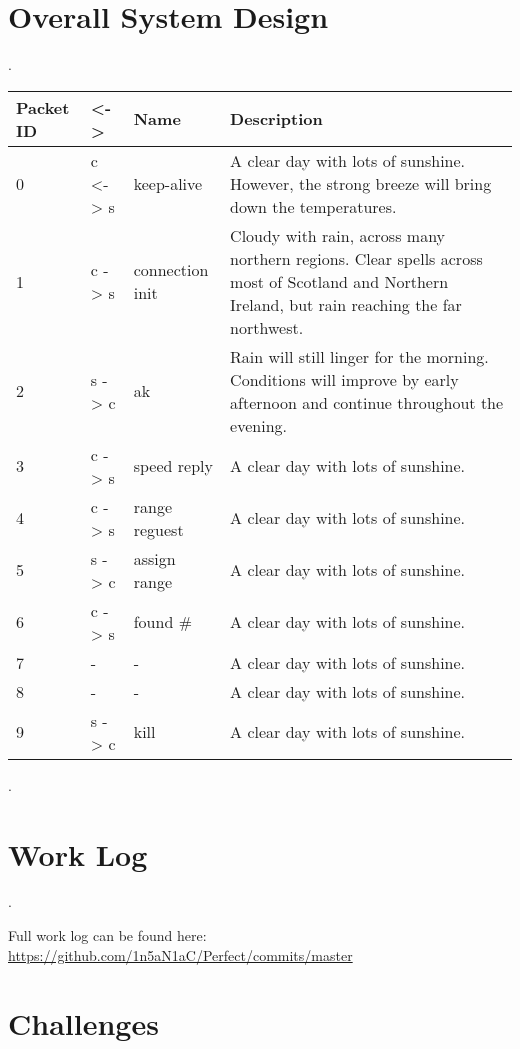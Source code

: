 \documentclass[letterpaper,10pt,titlepage]{article}
\begin{document}
\tableofcontents

\section{Overall System Design}

.

\begin{center}
    \begin{tabular}{ | l | l | l | p{5cm} |}
    \hline
    Packet ID & <-> & Name & Description \\ \hline
    0 & c <-> s & keep-alive & A clear day with lots of sunshine.  
    However, the strong breeze will bring down the temperatures. \\ \hline
    1 & c -> s & connection init & Cloudy with rain, across many northern regions. Clear spells
    across most of Scotland and Northern Ireland,
    but rain reaching the far northwest. \\ \hline
    2 & s -> c & ak & Rain will still linger for the morning.
    Conditions will improve by early afternoon and continue
    throughout the evening. \\ \hline
	3 & c -> s & speed reply & A clear day with lots of sunshine. \\ \hline
	4 & c -> s & range reguest & A clear day with lots of sunshine. \\ \hline
	5 & s -> c & assign range & A clear day with lots of sunshine. \\ \hline
	6 & c -> s & found \# & A clear day with lots of sunshine. \\ \hline
	7 & - & - & A clear day with lots of sunshine. \\ \hline
	8 & - & - & A clear day with lots of sunshine. \\ \hline
	9 & s -> c & kill & A clear day with lots of sunshine. \\ \hline
    \end{tabular}
\end{center}

.

\section{Work Log}

.

Full work log can be found here:
\url{https://github.com/1n5aN1aC/Perfect/commits/master}

\section{Challenges}
\end{document}
